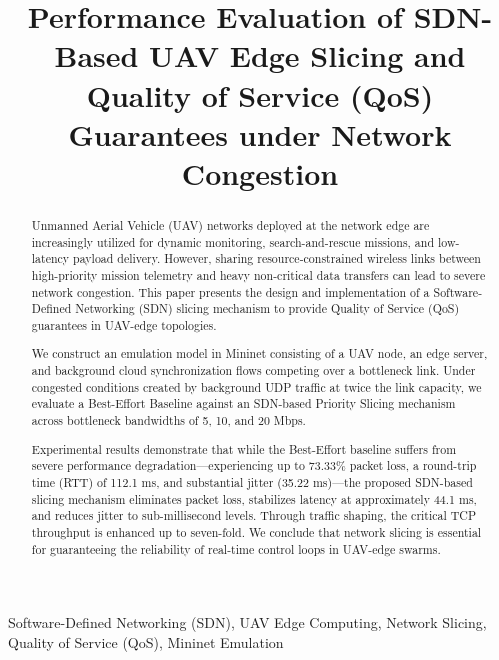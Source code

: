 \documentclass[conference]{IEEEtran}
\begin{document}
\title{Performance Evaluation of SDN-Based UAV Edge Slicing and Quality of Service (QoS) Guarantees under Network Congestion}

\author{
}

\maketitle

\begin{abstract}
Unmanned Aerial Vehicle (UAV) networks deployed at the network edge are increasingly utilized for dynamic monitoring, search-and-rescue missions, and low-latency payload delivery. However, sharing resource-constrained wireless links between high-priority mission telemetry and heavy non-critical data transfers can lead to severe network congestion. This paper presents the design and implementation of a Software-Defined Networking (SDN) slicing mechanism to provide Quality of Service (QoS) guarantees in UAV-edge topologies. 

We construct an emulation model in Mininet consisting of a UAV node, an edge server, and background cloud synchronization flows competing over a bottleneck link. Under congested conditions created by background UDP traffic at twice the link capacity, we evaluate a Best-Effort Baseline against an SDN-based Priority Slicing mechanism across bottleneck bandwidths of 5, 10, and 20 Mbps. 

Experimental results demonstrate that while the Best-Effort baseline suffers from severe performance degradation—experiencing up to 73.33\% packet loss, a round-trip time (RTT) of 112.1 ms, and substantial jitter (35.22 ms)—the proposed SDN-based slicing mechanism eliminates packet loss, stabilizes latency at approximately 44.1 ms, and reduces jitter to sub-millisecond levels. Through traffic shaping, the critical TCP throughput is enhanced up to seven-fold. We conclude that network slicing is essential for guaranteeing the reliability of real-time control loops in UAV-edge swarms.
\end{abstract}

\begin{IEEEkeywords}
Software-Defined Networking (SDN), UAV Edge Computing, Network Slicing, Quality of Service (QoS), Mininet Emulation
\end{IEEEkeywords}
\end{document}
